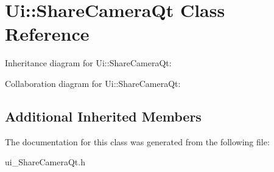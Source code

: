 \hypertarget{class_ui_1_1_share_camera_qt}{\section{Ui\-:\-:Share\-Camera\-Qt Class Reference}
\label{class_ui_1_1_share_camera_qt}
}


Inheritance diagram for Ui\-:\-:Share\-Camera\-Qt\-:


Collaboration diagram for Ui\-:\-:Share\-Camera\-Qt\-:
\subsection*{Additional Inherited Members}


The documentation for this class was generated from the following file\-:\begin{DoxyCompactItemize}
\item 
ui\-\_\-\-Share\-Camera\-Qt.\-h\end{DoxyCompactItemize}
